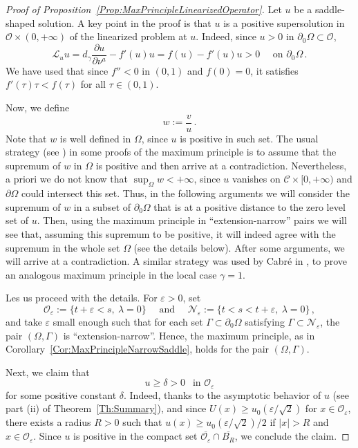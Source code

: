 \documentclass[twoside,leqno,symbols-for-thanks, draft]{rmi}
\numberwithin{equation}{section}
\theoremstyle{definition}
\newcommand{\ccal}{\mathscr{C}}
\newcommand{\ocal}{\mathcal{O}}
\newcommand{\s}{\gamma}
\begin{document}
\begin{proof}[Proof of Proposition~\ref{Prop:MaxPrincipleLinearizedOperator}]
	Let $u$ be a saddle-shaped solution. A key point in the proof is that $u$ is a positive supersolution in $\ocal\times(0,+\infty)$ of the linearized problem at $u$. Indeed, since $u>0$ in $\partial_0\Omega \subset \ocal$,
	\begin{equation}
	\label{Eq:uSupersolLinearized}
	\mathscr{L}_u u = d_\s \dfrac{\partial u}{\partial \nu^a}  -f'(u) u = f(u) - f'(u) u > 0\quad \text{ on } \partial_0\Omega \,.
	\end{equation}
	We have used that since $f''<0$ in $(0,1)$ and $f(0)=0$, it satisfies $f'(\tau)\tau < f(\tau)$ for all $\tau\in (0,1)$.
	
	
	Now, we define
	$$
	w := \dfrac{v}{u}\,.
	$$
	Note that $w$ is well defined in $\Omega$, since $u$ is positive in such set. The usual strategy (see \cite{BerestyckiNirembergVaradhan}) in some proofs of the maximum principle is to assume that the supremum of $w$ in $\Omega$ is positive and then arrive at a contradiction.  Nevertheless, a priori we do not know that $\sup_\Omega w< +\infty$, since $u$ vanishes on $\ccal\times [0,+\infty)$ and $\partial \Omega$ could intersect this set. Thus, in the following arguments we will consider the supremum of $w$ in a subset of $\partial_0 \Omega$ that is at a positive distance to the zero level set of $u$. Then, using the maximum principle in ``extension-narrow'' pairs we will see that, assuming this supremum to be positive, it will indeed agree with the supremum in the whole set $\Omega$ (see the details below). After some arguments, we will arrive at a contradiction. A similar strategy was used by Cabr\'e in \cite{Cabre-Saddle}, to prove an analogous maximum principle in the local case $\s = 1$.
	
	
	Les us proceed with the details. For $\varepsilon > 0$, set
	$$
	\ocal_\varepsilon := \{t +\varepsilon < s,\ \lambda = 0 \} \quad \textrm{ and } \quad \mathcal{N}_\varepsilon := \{t < s < t+\varepsilon ,\ \lambda = 0 \}\,,
	$$
	and take $\varepsilon$ small enough such that for each set $\Gamma \subset \partial_0 \Omega$ satisfying $\Gamma \subset \mathcal{N}_\varepsilon$, the pair $(\Omega, \Gamma)$  is ``extension-narrow''. Hence, the maximum principle, as in Corollary~\ref{Cor:MaxPrincipleNarrowSaddle}, holds for the pair $(\Omega, \Gamma)$. 
	
	Next, we claim that
	\begin{equation}
	\label{Eq:u>delta}
	u \geq \delta >0\ \ \text{ in }   \ocal_\varepsilon
	\end{equation}
	for some positive constant $\delta$. Indeed, thanks to the asymptotic behavior of $u$ (see part (ii) of Theorem~\ref{Th:Summary}), and since $U(x) \geq u_0(\varepsilon/\sqrt{2})$ for $x\in \ocal_\varepsilon$,  there exists a radius $R>0$ such that $u(x) \geq u_0(\varepsilon/\sqrt{2})/2$ if $|x|>R$ and $x\in \ocal_\varepsilon$. Since $u$ is positive in the compact set $\overline{\ocal_\varepsilon} \cap \overline{B_R}$, we conclude the claim.
	

\end{proof}
\end{document}
